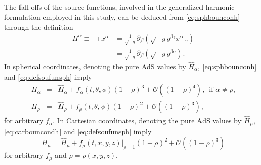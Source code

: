 \documentclass[aps,letterpaper,twocolumn,nofootinbib]{revtex4}
\numberwithin{equation}{section}
\begin{document}
The fall-offs of the source functions, involved in the generalized harmonic formulation employed in this study, can be deduced from \eqref{eq:sphbounconh} through the definition 
\begin{align}
\label{eq:defsoufunsph}
H^\alpha\equiv \Box x^\alpha&=\frac{1}{\sqrt{-g}}\partial_\beta (\sqrt{-g}g^{\beta\gamma}x^\alpha_{\;\;,\gamma})\nonumber\\
&=\frac{1}{\sqrt{-g}}\partial_\beta(\sqrt{-g}g^{\beta\alpha}).
\end{align}
In spherical coordinates, denoting the pure AdS values by $\hat{H}_\alpha$, \eqref{eq:sphbounconh} and \eqref{eq:defsoufunsph} imply
\begin{eqnarray}\label{eq:sphbouncondsoufunc}
H_\alpha&=&\hat{H}_\alpha+f_\alpha(t,\theta,\phi)(1-\rho)^3+\mathcal{O}((1-\rho)^4), \, \textrm{ if $\alpha\neq\rho$,} \nonumber \\
H_\rho&=&\hat{H}_\rho+f_\rho(t,\theta,\phi)(1-\rho)^2+\mathcal{O}((1-\rho)^3),
\end{eqnarray}
for arbitrary $f_\alpha$.
In Cartesian coordinates, denoting the pure AdS values by $\hat{H}_\mu$, \eqref{eq:carbouncondh} and \eqref{eq:defsoufunsph} imply
\begin{equation}\label{eq:carbouncondsoufun}
H_\mu=\hat{H}_\mu+f_\mu(t,x,y,z)|_{\rho=1}(1-\rho)^2+\mathcal{O}((1-\rho)^3)
\end{equation}
for arbitrary $f_\mu$ and $\rho=\rho(x,y,z)$.
\end{document}
